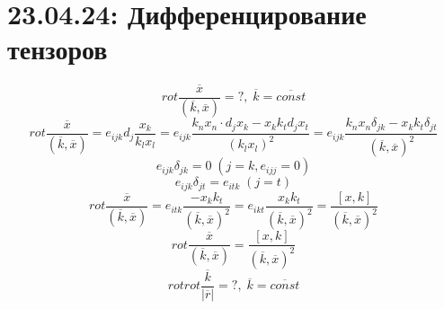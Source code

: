 \documentclass[1 pt]{article}
\begin{document}
\section{23.04.24: Дифференцирование тензоров}
\begin{equation}
    rot \frac{\overline{x}}{(\overline{k}, \overline{x})} = ?, \; \overline{k} = \overline{const}
\end{equation}
\begin{equation*}
    rot \frac{\overline{x}}{(\overline{k}, \overline{x})} = e_{ijk} d_{j} \frac{x_k}{k_l x_l} = e_{ijk} \frac{k_n x_n \cdot d_j x_k - x_k k_t d_j x_t }{(k_l x_l)^2} = e_{ijk} \frac{k_n x_n \delta_{jk} - x_k k_t \delta_{jt}}{(\overline{k}, \overline{x})^2}
\end{equation*}
\begin{equation*}
    e_{ijk} \delta_{jk} = 0 \; (j=k, e_{ijj}=0)
\end{equation*}
\begin{equation*}
    e_{ijk} \delta_{jt} = e_{itk} \; (j=t)
\end{equation*}
\begin{equation*}
    rot \frac{\overline{x}}{(\overline{k}, \overline{x})} = e_{itk} \frac{ - x_k k_t}{(\overline{k}, \overline{x})^2} = e_{ikt} \frac{ x_k k_t}{(\overline{k}, \overline{x})^2} = \frac{[x, k]}{(\overline{k}, \overline{x})^2}
\end{equation*}
\begin{equation}
    rot \frac{\overline{x}}{(\overline{k}, \overline{x})} = \frac{[x, k]}{(\overline{k}, \overline{x})^2}
\end{equation}
\begin{equation}
    rot rot \frac{\overline{k}}{|\overline{r}|} = ?, \; \overline{k} = \overline{const}
\end{equation}
\end{document}
